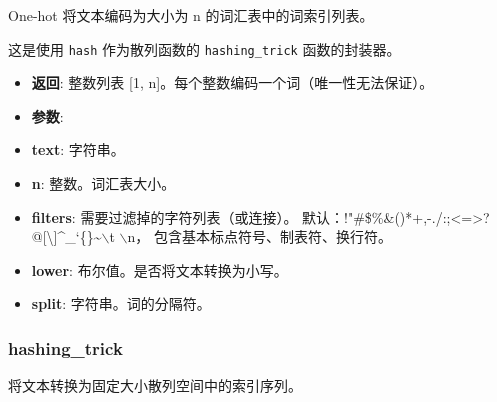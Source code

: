 One-hot 将文本编码为大小为 n 的词汇表中的词索引列表。

这是使用 \texttt{hash} 作为散列函数的 \texttt{hashing\_trick}
函数的封装器。

\begin{itemize}
\item
  \textbf{返回}: 整数列表 {[}1,
  n{]}。每个整数编码一个词（唯一性无法保证）。
\item
  \textbf{参数}:
\item
  \textbf{text}: 字符串。
\item
  \textbf{n}: 整数。词汇表大小。
\item
  \textbf{filters}: 需要过滤掉的字符列表（或连接）。
  默认：!"\#\$\%\&()*+,-./:;\textless{}=\textgreater{}?@{[}\textbackslash{}{]}\^{}\_`\{\textbar{}\}\textasciitilde{}$\backslash$t $\backslash$n，
  包含基本标点符号、制表符、换行符。
\item
  \textbf{lower}: 布尔值。是否将文本转换为小写。
\item
  \textbf{split}: 字符串。词的分隔符。
\end{itemize}

\subsubsection{hashing\_trick}\label{hashingux5ftrick}

\begin{Shaded}
\begin{Highlighting}[]
                                       \OperatorTok{=}\NormalTok{,}
                                       \OperatorTok{=}\StringTok{'!"\#\$\%\&()*+,-./:;<=>?@[}\CharTok{\textbackslash{}\textbackslash{}}\StringTok{]^_`\{|\}~}\NormalTok{,}
                                       \OperatorTok{=}\NormalTok{,}
                                       \OperatorTok{=}\NormalTok{)}
\end{Highlighting}
\end{Shaded}

将文本转换为固定大小散列空间中的索引序列。

